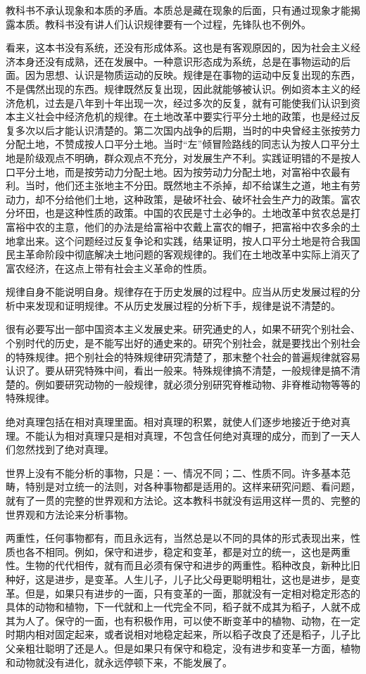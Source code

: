 教科书不承认现象和本质的矛盾。本质总是藏在现象的后面，只有通过现象才能揭露本质。教科书没有讲人们认识规律要有一个过程，先锋队也不例外。

看来，这本书没有系统，还没有形成体系。这也是有客观原因的，因为社会主义经济本身还没有成熟，还在发展中。一种意识形态成为系统，总是在事物运动的后面。因为思想、认识是物质运动的反映。规律是在事物的运动中反复出现的东西，不是偶然出现的东西。规律既然反复出现，因此就能够被认识。例如资本主义的经济危机，过去是八年到十年出现一次，经过多次的反复，就有可能使我们认识到资本主义社会中经济危机的规律。在土地改革中要实行平分土地的政策，也是经过反复多次以后才能认识清楚的。第二次国内战争的后期，当时的中央曾经主张按劳力分配土地，不赞成按人口平分土地。当时“左”倾冒险路线的同志认为按人口平分土地是阶级观点不明确，群众观点不充分，对发展生产不利。实践证明错的不是按人口平分土地，而是按劳动力分配土地。因为按劳动力分配土地，对富裕中农最有利。当时，他们还主张地主不分田。既然地主不杀掉，却不给谋生之道，地主有劳动力，却不分给他们土地，这种政策，是破坏社会、破坏社会生产力的政策。富农分坏田，也是这种性质的政策。中国的农民是寸土必争的。土地改革中贫农总是打富裕中农的主意，他们的办法是给富裕中农戴上富农的帽子，把富裕中农多余的土地拿出来。这个问题经过反复争论和实践，结果证明，按人口平分土地是符合我国民主革命阶段中彻底解决土地问题的客观规律的。我们在土地改革中实际上消灭了富农经济，在这点上带有社会主义革命的性质。

规律自身不能说明自身。规律存在于历史发展的过程中。应当从历史发展过程的分析中来发现和证明规律。不从历史发展过程的分析下手，规律是说不清楚的。

很有必要写出一部中国资本主义发展史来。研究通史的人，如果不研究个别社会、个别时代的历史，是不能写出好的通史来的。研究个别社会，就是要找出个别社会的特殊规律。把个别社会的特殊规律研究清楚了，那末整个社会的普遍规律就容易认识了。要从研究特殊中间，看出一般来。特殊规律搞不清楚，一般规律是搞不清楚的。例如要研究动物的一般规律，就必须分别研究脊椎动物、非脊椎动物等等的特殊规律。

绝对真理包括在相对真理里面。相对真理的积累，就使人们逐步地接近于绝对真理。不能认为相对真理只是相对真理，不包含任何绝对真理的成分，而到了一天人们忽然找到了绝对真理。

世界上没有不能分析的事物，只是：一、情况不同；二、性质不同。许多基本范畴，特别是对立统一的法则，对各种事物都是适用的。这样来研究问题、看问题，就有了一贯的完整的世界观和方法论。这本教科书就没有运用这样一贯的、完整的世界观和方法论来分析事物。

两重性，任何事物都有，而且永远有，当然总是以不同的具体的形式表现出来，性质也各不相同。例如，保守和进步，稳定和变革，都是对立的统一，这也是两重性。生物的代代相传，就有而且必须有保守和进步的两重性。稻种改良，新种比旧种好，这是进步，是变革。人生儿子，儿子比父母更聪明粗壮，这也是进步，是变革。但是，如果只有进步的一面，只有变革的一面，那就没有一定相对稳定形态的具体的动物和植物，下一代就和上一代完全不同，稻子就不成其为稻子，人就不成其为人了。保守的一面，也有积极作用，可以使不断变革中的植物、动物，在一定时期内相对固定起来，或者说相对地稳定起来，所以稻子改良了还是稻子，儿子比父亲粗壮聪明了还是人。但是如果只有保守和稳定，没有进步和变革一方面，植物和动物就没有进化，就永远停顿下来，不能发展了。

